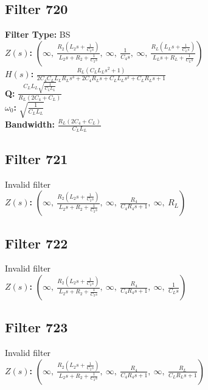 \documentclass{article}
\begin{document}
\subsection*{Filter 720}
\textbf{Filter Type:} BS \\ 
\textbf{$Z(s)$:} $\left( \infty, \  \frac{R_{2} \left(L_{2} s + \frac{1}{C_{2} s}\right)}{L_{2} s + R_{2} + \frac{1}{C_{2} s}}, \  \infty, \  \frac{1}{C_{4} s}, \  \infty, \  \frac{R_{L} \left(L_{L} s + \frac{1}{C_{L} s}\right)}{L_{L} s + R_{L} + \frac{1}{C_{L} s}}\right)$ \\ 
\textbf{$H(s)$:} $\frac{R_{L} \left(C_{L} L_{L} s^{2} + 1\right)}{2 C_{4} C_{L} L_{L} R_{L} s^{3} + 2 C_{4} R_{L} s + C_{L} L_{L} s^{2} + C_{L} R_{L} s + 1}$ \\ 
\textbf{Q:} $\frac{C_{L} L_{L} \sqrt{\frac{1}{C_{L} L_{L}}}}{R_{L} \left(2 C_{4} + C_{L}\right)}$ \\ 
\textbf{$\omega_0$:} $\sqrt{\frac{1}{C_{L} L_{L}}}$ \\ 
\textbf{Bandwidth:} $\frac{R_{L} \left(2 C_{4} + C_{L}\right)}{C_{L} L_{L}}$ \\ 
\subsection*{Filter 721}
Invalid filter \\ 
\textbf{$Z(s)$:} $\left( \infty, \  \frac{R_{2} \left(L_{2} s + \frac{1}{C_{2} s}\right)}{L_{2} s + R_{2} + \frac{1}{C_{2} s}}, \  \infty, \  \frac{R_{4}}{C_{4} R_{4} s + 1}, \  \infty, \  R_{L}\right)$ \\ 
\subsection*{Filter 722}
Invalid filter \\ 
\textbf{$Z(s)$:} $\left( \infty, \  \frac{R_{2} \left(L_{2} s + \frac{1}{C_{2} s}\right)}{L_{2} s + R_{2} + \frac{1}{C_{2} s}}, \  \infty, \  \frac{R_{4}}{C_{4} R_{4} s + 1}, \  \infty, \  \frac{1}{C_{L} s}\right)$ \\ 
\subsection*{Filter 723}
Invalid filter \\ 
\textbf{$Z(s)$:} $\left( \infty, \  \frac{R_{2} \left(L_{2} s + \frac{1}{C_{2} s}\right)}{L_{2} s + R_{2} + \frac{1}{C_{2} s}}, \  \infty, \  \frac{R_{4}}{C_{4} R_{4} s + 1}, \  \infty, \  \frac{R_{L}}{C_{L} R_{L} s + 1}\right)$ \\ 
\end{document}
